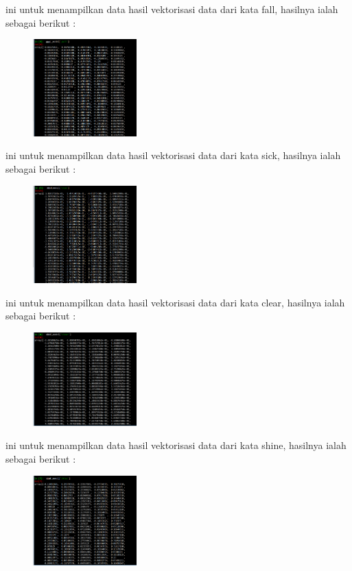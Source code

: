 \begin{enumerate}
	\hfill\break
	
	ini untuk menampilkan data hasil vektorisasi data dari kata fall, hasilnya ialah sebagai berikut : 
	\begin{figure}[H]
	\centering
		\includegraphics[width=4cm]{figures/1174073/tugas5/materi/hasil1_4.PNG}
	\end{figure}

	\hfill\break
	
	ini untuk menampilkan data hasil vektorisasi data dari kata sick, hasilnya ialah sebagai berikut : 
	\begin{figure}[H]
	\centering
		\includegraphics[width=4cm]{figures/1174073/tugas5/materi/hasil1_5.PNG}
	\end{figure}

	\hfill\break
	
	ini untuk menampilkan data hasil vektorisasi data dari kata clear, hasilnya ialah sebagai berikut : 
	\begin{figure}[H]
	\centering
		\includegraphics[width=4cm]{figures/1174073/tugas5/materi/hasil1_6.PNG}
	\end{figure}

	\hfill\break
	
	ini untuk menampilkan data hasil vektorisasi data dari kata shine, hasilnya ialah sebagai berikut : 
	\begin{figure}[H]
	\centering
		\includegraphics[width=4cm]{figures/1174073/tugas5/materi/hasil1_7.PNG}
	\end{figure}


\end{enumerate}
